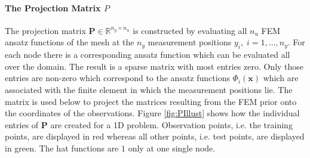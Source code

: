 \documentclass[%
  a4paper,oneside,%
  11pt,%
  smallchapters,
  style=printdev,
  extramargin,
  green,%
  rgb, <cmyk>
  ]{tubsbook}
\begin{document}
\paragraph{The Projection Matrix $P$}
The projection matrix $\bm{P} \in \mathbb{R}^{n_y \times n_u}$ is constructed by evaluating all $n_u$ FEM ansatz functions of the mesh at the $n_y$ measurement positions $y_i, \; i=1,...,n_y$. For each node there is a corresponding ansatz function which can be evaluated all over the domain. The result is a sparse matrix with most entries zero. Only those entries are non-zero which correspond to the ansatz functions $\Phi_i(\bm{\bm{x}})$ which are associated with the finite element in which the measurement positions lie. The matrix is used below to project the matrices resulting from the FEM prior onto the coordinates of the observations. Figure \ref{fig:PIllust} shows how the individual entries of $\bm{P}$ are created for a 1D problem. Observation points, i.e. the training points, are displayed in red whereas all other points, i.e. test points, are displayed in green. The hat functions are $1$ only at one single node.
%
\end{document}

